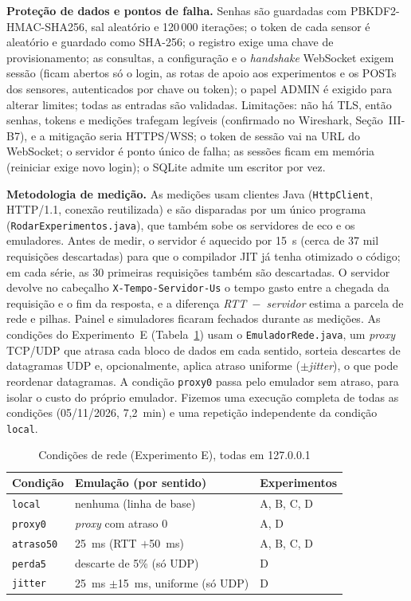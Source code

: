\documentclass[conference]{IEEEtran}
\begin{document}
\textbf{Proteção de dados e pontos de falha.} Senhas são guardadas com PBKDF2-HMAC-SHA256, sal aleatório e 120\,000 iterações; o token de cada sensor é aleatório e guardado como SHA-256; o registro exige uma chave de provisionamento; as consultas, a configuração e o \emph{handshake} WebSocket exigem sessão (ficam abertos só o login, as rotas de apoio aos experimentos e os POSTs dos sensores, autenticados por chave ou token); o papel ADMIN é exigido para alterar limites; todas as entradas são validadas. Limitações: não há TLS, então senhas, tokens e medições trafegam legíveis (confirmado no Wireshark, Seção~III-B7), e a mitigação seria HTTPS/WSS; o token de sessão vai na URL do WebSocket; o servidor é ponto único de falha; as sessões ficam em memória (reiniciar exige novo login); o SQLite admite um escritor por vez.

\textbf{Metodologia de medição.} As medições usam clientes Java (\texttt{HttpClient}, HTTP/1.1, conexão reutilizada) e são disparadas por um único programa (\texttt{RodarExperimentos.java}), que também sobe os servidores de eco e os emuladores. Antes de medir, o servidor é aquecido por 15~s (cerca de 37 mil requisições descartadas) para que o compilador JIT já tenha otimizado o código; em cada série, as 30 primeiras requisições também são descartadas. O servidor devolve no cabeçalho \texttt{X-Tempo-Servidor-Us} o tempo gasto entre a chegada da requisição e o fim da resposta, e a diferença \emph{RTT~$-$~servidor} estima a parcela de rede e pilhas. Painel e simuladores ficaram fechados durante as medições. As condições do Experimento~E (Tabela~\ref{tab:cond}) usam o \texttt{EmuladorRede.java}, um \emph{proxy} TCP/UDP que atrasa cada bloco de dados em cada sentido, sorteia descartes de datagramas UDP e, opcionalmente, aplica atraso uniforme ($\pm$\emph{jitter}), o que pode reordenar datagramas. A condição \texttt{proxy0} passa pelo emulador sem atraso, para isolar o custo do próprio emulador. Fizemos uma execução completa de todas as condições (05/11/2026, 7,2~min) e uma repetição independente da condição \texttt{local}.

\begin{table}[t]
\centering\scriptsize\setlength{\tabcolsep}{4pt}
\caption{Condições de rede (Experimento E), todas em 127.0.0.1}
\label{tab:cond}
\begin{tabular}{@{}lll@{}}
\toprule
Condição & Emulação (por sentido) & Experimentos\\
\midrule
\texttt{local} & nenhuma (linha de base) & A, B, C, D\\
\texttt{proxy0} & \emph{proxy} com atraso 0 & A, D\\
\texttt{atraso50} & 25~ms (RTT $+$50~ms) & A, B, C, D\\
\texttt{perda5} & descarte de 5\% (só UDP) & D\\
\texttt{jitter} & 25~ms $\pm$15~ms, uniforme (só UDP) & D\\
\bottomrule
\end{tabular}
\end{table}
\end{document}
